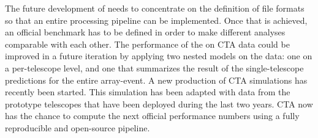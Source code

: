 The future development of \ctapipe needs to concentrate on the definition of file formats so that 
an entire processing pipeline can be implemented. Once that is achieved, an official benchmark has to be defined 
in order to make different analyses comparable with each other. 
The performance of the \aicttools on CTA data could be improved in a future iteration by applying two nested models on the data: one on 
a per-telescope level, and one that summarizes the result of the single-telescope predictions for the entire array-event. 
A new production of CTA simulations has recently been started. This simulation has been adapted with data from the prototype 
telescopes that have been deployed during the last two years. 
CTA now has the chance to compute the next official performance numbers using a fully reproducible and open-source pipeline. 